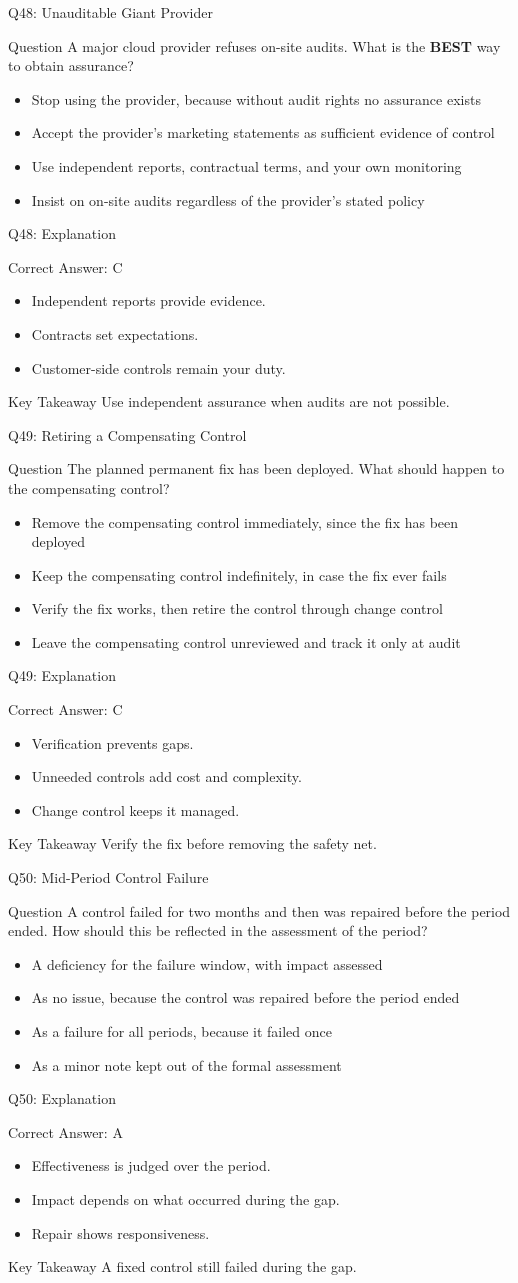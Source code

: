 \documentclass[aspectratio=169]{beamer}
\newcommand{\hq}[7]{%
	\begin{frame}{Q#1: #2}
		\begin{block}{Question}
			#3
		\end{block}
		\begin{itemize}
			#4
		\end{itemize}
	\end{frame}
	\begin{frame}{Q#1: Explanation}
		\begin{block}{Correct Answer: #5}
			\begin{itemize}
				#6
			\end{itemize}
		\end{block}
		\begin{alertblock}{Key Takeaway}
			#7
		\end{alertblock}
	\end{frame}
}
\begin{document}
	\hq{48}{Unauditable Giant Provider}
	{A major cloud provider refuses on-site audits. What is the \textbf{BEST} way to obtain assurance?}
	{\item[\textbf{(A)}] Stop using the provider, because without audit rights no assurance exists
		\item[\textbf{(B)}] Accept the provider's marketing statements as sufficient evidence of control
		\item[\textbf{(C)}] Use independent reports, contractual terms, and your own monitoring
		\item[\textbf{(D)}] Insist on on-site audits regardless of the provider's stated policy}
	{C}
	{\item Independent reports provide evidence.
		\item Contracts set expectations.
		\item Customer-side controls remain your duty.}
	{Use independent assurance when audits are not possible.}

	\hq{49}{Retiring a Compensating Control}
	{The planned permanent fix has been deployed. What should happen to the compensating control?}
	{\item[\textbf{(A)}] Remove the compensating control immediately, since the fix has been deployed
		\item[\textbf{(B)}] Keep the compensating control indefinitely, in case the fix ever fails
		\item[\textbf{(C)}] Verify the fix works, then retire the control through change control
		\item[\textbf{(D)}] Leave the compensating control unreviewed and track it only at audit}
	{C}
	{\item Verification prevents gaps.
		\item Unneeded controls add cost and complexity.
		\item Change control keeps it managed.}
	{Verify the fix before removing the safety net.}

	\hq{50}{Mid-Period Control Failure}
	{A control failed for two months and then was repaired before the period ended. How should this be reflected in the assessment of the period?}
	{\item[\textbf{(A)}] A deficiency for the failure window, with impact assessed
		\item[\textbf{(B)}] As no issue, because the control was repaired before the period ended
		\item[\textbf{(C)}] As a failure for all periods, because it failed once
		\item[\textbf{(D)}] As a minor note kept out of the formal assessment}
	{A}
	{\item Effectiveness is judged over the period.
		\item Impact depends on what occurred during the gap.
		\item Repair shows responsiveness.}
	{A fixed control still failed during the gap.}
\end{document}
